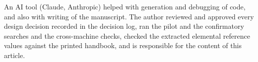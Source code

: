 An AI tool (Claude, Anthropic) helped with generation and debugging of code, and also with writing of the manuscript. The author reviewed and approved every design decision recorded in the decision log, ran the pilot and the confirmatory
searches and the cross-machine checks, checked the extracted elemental reference values against the printed handbook, and is responsible for the content of this article.
